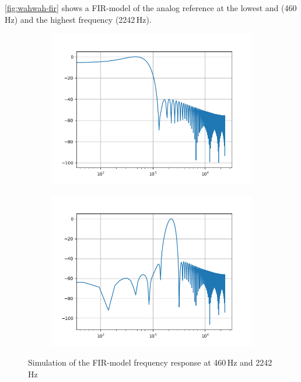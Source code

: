\autoref{fig:wahwah-fir} shows a \ac{FIR}-model of the analog reference at the lowest and (460\,Hz) and the highest
frequency (2242\,Hz).

\begin{figure}[!h]
    \centering
    \begin{subfigure}[c]{0.49\textwidth}
        \centering
        \includegraphics[width=\textwidth]{img/fir_bandpass460.png}
    \end{subfigure}
    \begin{subfigure}[c]{0.49\textwidth}
        \centering
        \includegraphics[width=\textwidth]{img/fir_bandpass2242.png}
    \end{subfigure}
    \caption{Simulation of the \ac{FIR}-model frequency response at 460\,Hz and 2242\,Hz}
    \label{fig:wahwah-fir}
\end{figure}

